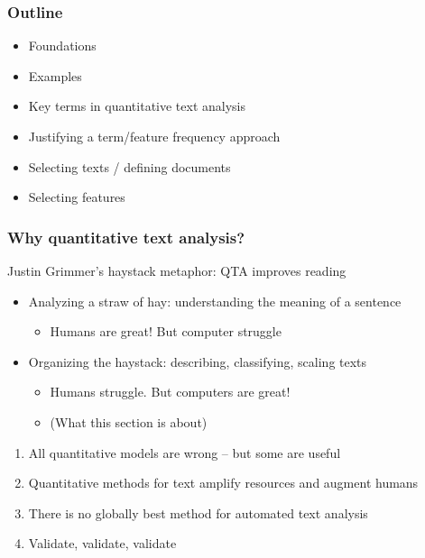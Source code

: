 \documentclass[notes=hide]{beamer}
\begin{document}
\begin{frame}
	\frametitle{Outline}
	\begin{itemize}
		\item Foundations
		\item Examples
		\item Key terms in quantitative text analysis
		\item Justifying a term/feature frequency approach
		\item Selecting texts / defining documents
		\item Selecting features
	\end{itemize}
\end{frame}



\begin{frame}
	\frametitle{Why quantitative text analysis?}
	
	Justin Grimmer's haystack metaphor: \alert{QTA improves reading}
	
	\begin{itemize}[<+->]
		\item Analyzing a straw of hay: understanding the meaning of a sentence
		\begin{itemize}
			\item Humans are great! But computer struggle
		\end{itemize}
		\item Organizing the haystack: describing, classifying, scaling texts
		\begin{itemize}
			\item Humans struggle. But computers are great!
			\item (What this section is about)
		\end{itemize}
	\end{itemize}
	\begin{enumerate}[<+->]
		\item All quantitative models are wrong -- but some are useful
		\item Quantitative methods for text amplify resources and augment humans
		\item There is no globally best method for automated text analysis
		\item Validate, validate, validate
	\end{enumerate}
	
\end{frame}
\end{document}
